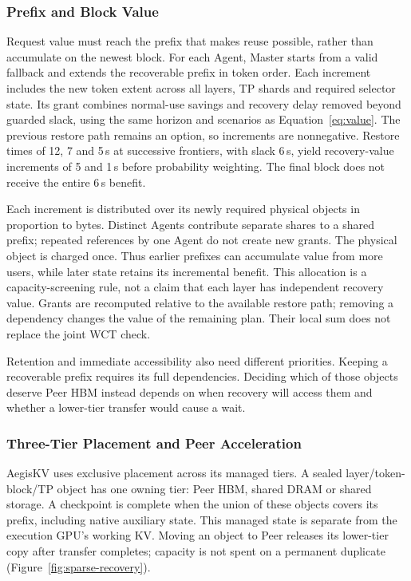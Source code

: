 \subsubsection{Prefix and Block Value}
\label{sec:prefix-value}

Request value must reach the prefix that makes reuse possible, rather
than accumulate on the newest block. For each Agent, Master starts from
a valid fallback and extends the recoverable prefix in token order.
Each increment includes the new token extent across all layers, TP shards
and required selector state. Its grant combines normal-use savings and
recovery delay removed beyond guarded slack, using the same horizon and
scenarios as Equation~\eqref{eq:value}. The previous restore path remains
an option, so increments are nonnegative. Restore times of 12, 7 and 5\,s
at successive frontiers, with slack 6\,s, yield recovery-value increments
of 5 and 1\,s before probability weighting. The final block does not
receive the entire 6\,s benefit.

Each increment is distributed over its newly required physical objects
in proportion to bytes. Distinct Agents contribute separate shares to a
shared prefix; repeated references by one Agent do not create new grants.
The physical object is charged once. Thus earlier prefixes can accumulate
value from more users, while later state retains its incremental benefit.
This allocation is a capacity-screening rule, not a claim that each layer
has independent recovery value. Grants are recomputed relative to the
available restore path; removing a dependency changes the value of the
remaining plan. Their local sum does not replace the joint WCT check.

Retention and immediate accessibility also need different priorities.
Keeping a recoverable prefix requires its full dependencies. Deciding
which of those objects deserve Peer HBM instead depends on when recovery
will access them and whether a lower-tier transfer would cause a wait.

\subsubsection{Three-Tier Placement and Peer Acceleration}
\label{sec:sparse-placement}

AegisKV uses exclusive placement across its managed tiers. A sealed
layer/token-block/TP object has one owning tier: Peer HBM, shared DRAM or
shared storage. A checkpoint is complete when the union of these objects
covers its prefix, including native auxiliary state. This managed state
is separate from the execution GPU's working KV. Moving an object to Peer
releases its lower-tier copy after transfer completes; capacity is not
spent on a permanent duplicate (Figure~\ref{fig:sparse-recovery}).

